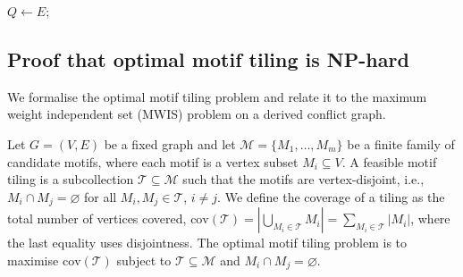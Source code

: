 \documentclass[
  11pt,
  letterpaper]{siamart251216}
\begin{document}
\begin{algorithm2e}[H]
\caption{$\varepsilon$-Thickness Repair}
\label{alg:thick-repair}

$Q \gets E$;\\


\end{algorithm2e}

\subsection{Proof that optimal motif tiling is
NP-hard}\label{sec-np-hard-proof}

We formalise the optimal motif tiling problem and relate it to the
maximum weight independent set (MWIS) problem on a derived conflict
graph.

Let \(G = (V,E)\) be a fixed graph and let
\(\mathcal{M} = \{M_1,\dots,M_m\}\) be a finite family of candidate
motifs, where each motif is a vertex subset \(M_i \subseteq V\). A
feasible motif tiling is a subcollection
\(\mathcal{T} \subseteq \mathcal{M}\) such that the motifs are
vertex-disjoint, i.e., \(M_i \cap M_j = \varnothing\) for all
\(M_i, M_j \in \mathcal{T}\), \(i \ne j\). We define the coverage of a
tiling as the total number of vertices covered,
\(\mathrm{cov}(\mathcal{T}) = |\bigcup_{M_i \in \mathcal{T}} M_i| = \sum_{M_i \in \mathcal{T}} |M_i|\),
where the last equality uses disjointness. The optimal motif tiling
problem is to maximise \(\mathrm{cov}(\mathcal{T})\) subject to
\(\mathcal{T} \subseteq \mathcal{M}\) and
\(M_i \cap M_j = \varnothing\).
\end{document}
